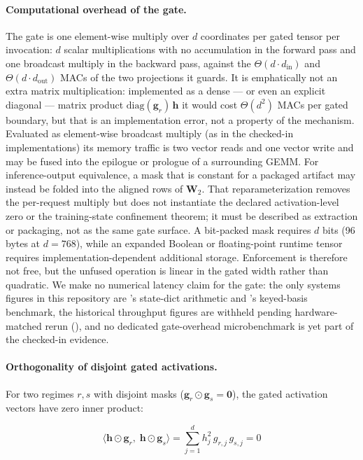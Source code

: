 \documentclass[11pt,a4paper]{article}
\newcommand{\bh}{\mathbf{h}}
\newcommand{\bW}{\mathbf{W}}
\newcommand{\bg}{\mathbf{g}}
\begin{document}
\paragraph{Computational overhead of the gate.}
\label{sec:gate-overhead}
The gate is one element-wise multiply over $d$ coordinates per gated
tensor per invocation: $d$ scalar multiplications with no accumulation in the
forward pass and one broadcast multiply in the backward pass, against
the $\Theta(d\cdot d_{\text{in}})$ and $\Theta(d\cdot d_{\text{out}})$
MACs of the two projections it guards.  It is emphatically not an
extra matrix multiplication: implemented as a dense --- or even an
explicit diagonal --- matrix product $\mathrm{diag}(\bg_r)\,\bh$ it
would cost $\Theta(d^2)$ MACs per gated boundary, but that is an
implementation error, not a property of the mechanism.  Evaluated as
element-wise broadcast multiply (as in the checked-in implementations)
its memory traffic is two vector reads and one vector write and may be
fused into the epilogue or prologue of a surrounding GEMM.  For
inference-output equivalence, a mask that is constant for a packaged
artifact may instead be folded into the aligned rows of $\bW_2$.
That reparameterization removes the per-request multiply but does not
instantiate the declared activation-level zero or the training-state
confinement theorem; it must be described as extraction or packaging,
not as the same gate surface.  A bit-packed mask requires $d$ bits
(96 bytes at $d{=}768$), while an expanded Boolean or floating-point
runtime tensor requires implementation-dependent additional storage.
Enforcement is therefore not free, but the unfused operation is linear
in the gated width rather than quadratic.  We make no numerical latency claim for the
gate: the only systems figures in this repository are
's state-dict arithmetic and
's keyed-basis benchmark, the
historical throughput figures are withheld pending hardware-matched
rerun (), and no dedicated gate-overhead
microbenchmark is yet part of the checked-in evidence.

\paragraph{Orthogonality of disjoint gated activations.}
For two regimes $r,s$ with disjoint masks
($\bg_r \odot \bg_s = \mathbf{0}$), the gated activation vectors
have zero inner product:

\begin{equation}
\langle \bh \odot \bg_r, \; \bh \odot \bg_s \rangle
= \sum_{j=1}^{d} h_j^2 \, g_{r,j} \, g_{s,j}
= 0
\label{eq:entanglement-breaking}
\end{equation}
\end{document}
